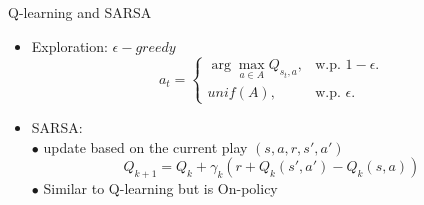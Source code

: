 \begin{frame}{Q-learning and SARSA}
    \begin{itemize}
        \item Exploration: $\epsilon - greedy$\\
        \begin{equation}
            a_{t}=\begin{cases}
             \arg\max_{a \in A}Q_{s_{t},a}, & \text{w.p.   } 1-\epsilon.\\
             unif(A), & \text{w.p.   } \epsilon.
        \end{cases}
        \end{equation}

        \item SARSA:\\
        \hspace{0.5cm}$\bullet$  update based on the current play $(s,a,r,s',a')$ \\
        \begin{equation}
            Q_{k+1}=Q_{k}+\gamma_{k}(r+Q_{k}(s',a')-Q_{k}(s,a))
        \end{equation}
        \hspace{0.5cm}$\bullet$  Similar to Q-learning but is On-policy \\


    \end{itemize}
\end{frame}



